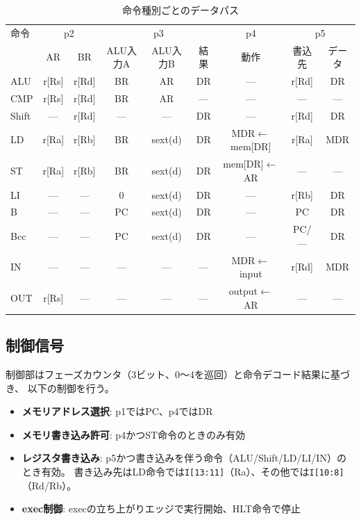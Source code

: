 \documentclass[a4paper,11pt]{ltjsarticle}
\begin{document}
\begin{table}[h]
\centering
\caption{命令種別ごとのデータパス}
\label{tab:datapath}
\small
\begin{tabular}{l|cc|ccc|c|cc}
\toprule
命令 & \multicolumn{2}{c|}{p2} & \multicolumn{3}{c|}{p3} & p4 & \multicolumn{2}{c}{p5} \\
     & AR & BR & ALU入力A & ALU入力B & 結果 & 動作 & 書込先 & データ \\
\midrule
ALU  & r[Rs] & r[Rd] & BR & AR & DR & --- & r[Rd] & DR \\
CMP  & r[Rs] & r[Rd] & BR & AR & --- & --- & --- & --- \\
Shift& ---   & r[Rd] & ---& --- & DR & --- & r[Rd] & DR \\
LD   & r[Ra] & r[Rb] & BR & sext(d) & DR & MDR$\leftarrow$mem[DR] & r[Ra] & MDR \\
ST   & r[Ra] & r[Rb] & BR & sext(d) & DR & mem[DR]$\leftarrow$AR & --- & --- \\
LI   & ---   & ---   & 0  & sext(d) & DR & --- & r[Rb] & DR \\
B    & ---   & ---   & PC & sext(d) & DR & --- & PC & DR \\
Bcc  & ---   & ---   & PC & sext(d) & DR & --- & PC/--- & DR \\
IN   & ---   & ---   & ---& ---     & ---& MDR$\leftarrow$input & r[Rd] & MDR \\
OUT  & r[Rs] & ---   & ---& ---     & ---& output$\leftarrow$AR & --- & --- \\
\bottomrule
\end{tabular}
\end{table}

\subsection{制御信号}

制御部はフェーズカウンタ（3ビット、0〜4を巡回）と命令デコード結果に基づき、
以下の制御を行う。

\begin{itemize}
\item \textbf{メモリアドレス選択}: p1ではPC、p4ではDR
\item \textbf{メモリ書き込み許可}: p4かつST命令のときのみ有効
\item \textbf{レジスタ書き込み}: p5かつ書き込みを伴う命令（ALU/Shift/LD/LI/IN）のとき有効。
  書き込み先はLD命令では\texttt{I[13:11]}（Ra）、その他では\texttt{I[10:8]}（Rd/Rb）。
\item \textbf{exec制御}: execの立ち上がりエッジで実行開始、HLT命令で停止
\end{itemize}
\end{document}
